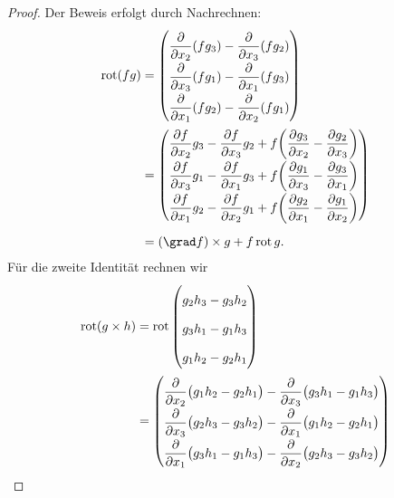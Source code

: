 \begin{proof}
Der Beweis erfolgt durch Nachrechnen:
\bgroup
\renewcommand{\arraystretch}{1.9}
\begin{align*}
\operatorname{rot}(fg)
&=
\begin{pmatrix}
\displaystyle
\frac{\partial}{\partial x_2}(fg_3)-\frac{\partial}{\partial x_3}(fg_2)
\\
\displaystyle
\frac{\partial}{\partial x_3}(fg_1)-\frac{\partial}{\partial x_1}(fg_3)
\\
\displaystyle
\frac{\partial}{\partial x_1}(fg_2)-\frac{\partial}{\partial x_2}(fg_1)
\end{pmatrix}
\\
&=
\begin{pmatrix}
\displaystyle
\frac{\partial f}{\partial x_2}g_3
-\frac{\partial f}{\partial x_3}g_2
+
f\biggl(\frac{\partial g_3}{\partial x_2}
-\frac{\partial g_2}{\partial x_3}\biggr)
\\
\displaystyle
\frac{\partial f}{\partial x_3}g_1
-\frac{\partial f}{\partial x_1}g_3
+
f\biggl(\frac{\partial g_1}{\partial x_3}
-\frac{\partial g_3}{\partial x_1}\biggr)
\\
\displaystyle
\frac{\partial f}{\partial x_1}g_2
-\frac{\partial f}{\partial x_2}g_1
+
f\biggl(\frac{\partial g_2}{\partial x_1}
-\frac{\partial g_1}{\partial x_2}\biggr)
\end{pmatrix}
\\[5pt]
&=
(\grad f)\times g + f\operatorname{rot}g.
\end{align*}
\egroup
Für die zweite Identität rechnen wir
\begin{align*}
\operatorname{rot}(g\times h)
&=
\operatorname{rot}
\begin{pmatrix}
g_2h_3-g_3h_2\\
g_3h_1-g_1h_3\\
g_1h_2-g_2h_1
\end{pmatrix}
\\
&=
{\renewcommand{\arraystretch}{1.9}
\begin{pmatrix}
\displaystyle
\frac{\partial}{\partial x_2}
\bigl(g_1h_2-g_2h_1\bigr)
-
\frac{\partial}{\partial x_3}
\bigl(g_3h_1-g_1h_3\bigr)
\\
\displaystyle
\frac{\partial}{\partial x_3}
\bigl(g_2h_3-g_3h_2\bigr)
-
\frac{\partial}{\partial x_1}
\bigl(g_1h_2-g_2h_1\bigr)
\\
\displaystyle
\frac{\partial}{\partial x_1}
\bigl(g_3h_1-g_1h_3\bigr)
-
\frac{\partial}{\partial x_2}
\bigl(g_2h_3-g_3h_2\bigr)
\end{pmatrix}}

\end{align*}
\end{proof}
